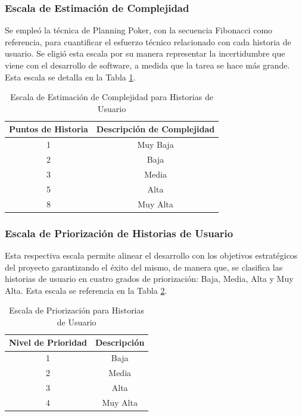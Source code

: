 \subsubsection{Escala de Estimación de Complejidad}

Se empleó la técnica de Planning Poker, con la secuencia Fibonacci como referencia, para cuantificar el esfuerzo técnico relacionado con cada historia de usuario. Se eligió esta escala  por su manera representar la incertidumbre que viene con el desarrollo de software, a medida que la tarea se hace más grande. Esta escala se detalla en la Tabla \ref{tab:escala-complejidad}.

\begin{table}[H]
\caption{Escala de Estimación de Complejidad para Historias de Usuario}
\label{tab:escala-complejidad}
\centering
\begin{tabular}{|c|c|}
\hline
\textbf{Puntos de Historia} & \textbf{Descripción de Complejidad} \\ \hline
1 & Muy Baja \\ \hline
2 & Baja\\ \hline
3 & Media\\ \hline
5 & Alta \\ \hline
8 & Muy Alta\\ \hline
\end{tabular}
\end{table}     

\subsubsection{Escala de Priorización de Historias de Usuario}

Esta respectiva escala permite alinear el desarrollo con los objetivos estratégicos del proyecto garantizando el éxito del mismo, de manera que, se clasifica las historias de usuario en cuatro grados de priorización: Baja, Media, Alta y Muy Alta. Esta escala se referencia en la Tabla \ref{tab:escala-priorizacion}.
\begin{table}[H]
\caption{Escala de Priorización para Historias de Usuario}
\label{tab:escala-priorizacion}
\centering
\begin{tabular}{|c|c|}
\hline
\textbf{Nivel de Prioridad} & \textbf{Descripción} \\ \hline
1 & Baja \\ \hline
2 & Media \\ \hline
3 & Alta \\ \hline
4 & Muy Alta \\ \hline
\end{tabular}
\end{table} 

